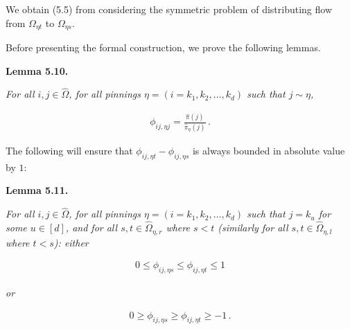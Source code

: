 \documentclass[10pt,a4paper]{article}
\begin{document}
We obtain (5.5) from considering the symmetric problem of distributing flow from $\Omega_{\eta t}$ to $\Omega_{\eta s}$.\par




Before presenting the formal construction, we prove the following lemmas.\par





\par\medskip\noindent\textbf{\textbf{Lemma 5.10}\textbf{.}}\par



\emph{For all $i,j\in\hat{\Omega}$, for all pinnings $\eta=(i=k_{1},k_{2},\dots,k_{d})$ such that $j\sim\eta$,}\par


\[\begin{gathered}
\phi_{ij,\eta j}=\frac{\hat{\pi}(j)}{\hat{\pi}_{\eta}(j)}\,.
\end{gathered}\]






The following will ensure that $\phi_{ij,\eta t}-\phi_{ij,\eta s}$ is always bounded in absolute value by $1$:\par





\par\medskip\noindent\textbf{\textbf{Lemma 5.11}\textbf{.}}\par



\emph{For all $i,j\in\hat{\Omega}$, for all pinnings $\eta=(i=k_{1},k_{2},\dots,k_{d})$ such that $j=k_{u}$ for some $u\in[d]$, and for all $s,t\in\hat{\Omega}_{\eta,r}$ where $s<t$ (similarly for all $s,t\in\hat{\Omega}_{\eta,l}$ where $t<s$):
either}\par


\[\begin{gathered}
0\leq\phi_{ij,\eta s}\leq\phi_{ij,\eta t}\leq 1
\end{gathered}\]


\emph{or}\par


\[\begin{gathered}
0\geq\phi_{ij,\eta s}\geq\phi_{ij,\eta t}\geq-1\,.
\end{gathered}\]
\end{document}
